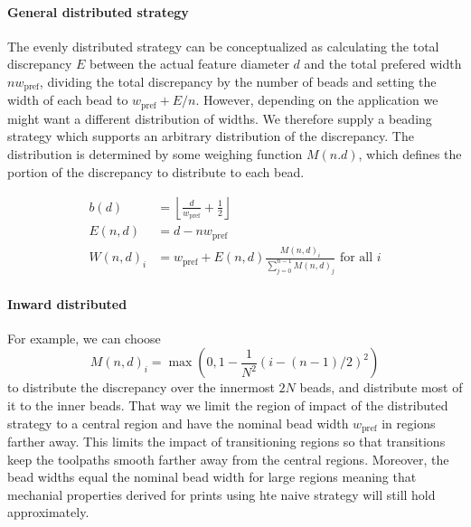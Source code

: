 \paragraph{General distributed strategy}
The evenly distributed strategy can be conceptualized as calculating the total discrepancy $E$ between the actual feature diameter $d$ and the total prefered width $n w_\text{pref}$, dividing the total discrepancy by the number of beads and setting the width of each bead to 
$w_\text{pref} + E / n$.
However, depending on the application we might want a different distribution of widths.
We therefore supply a beading strategy which supports an arbitrary distribution of the discrepancy.
The distribution is determined by some weighing function $M(n.d)$, which defines the portion of the discrepancy to distribute to each bead.


\begin{align*}
b(d) &= \left\lfloor \frac{d}{ w_\text{pref}} + \frac12 \right\rfloor \\
E(n,d) &= d - n w_\text{pref} \\
W(n,d)_i &= w_\text{pref} + E(n,d) \frac{M(n,d)_i}{\sum_{j=0}^{n-1} M(n,d)_j} \text{ for all } i 
\end{align*}


\paragraph{Inward distributed}
For example, we can choose 
$$M(n,d)_i = \max(0, 1 - \frac{1}{N^2} (i - (n-1)/2)^2 )$$
to distribute the discrepancy over the innermost $2N$ beads, and distribute most of it to the inner beads.
That way we limit the region of impact of the distributed strategy to a central region and have the nominal bead width $w_\text{pref}$ in regions farther away.
This limits the impact of transitioning regions so that transitions keep the toolpaths smooth farther away from the central regions. %
Moreover, the bead widths equal the nominal bead width for large regions meaning that mechanial properties derived for prints using hte naive strategy will still hold approximately.




